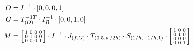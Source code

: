 \begin{equation}
    \begin{aligned}
        O & = I^{-1} \cdot [0, 0, 0, 1]                       \\
        G & = T_{(O)}^{-1T} \cdot I_R^{-1} \cdot [0, 0, 1, 0] \\
        M & =
        \begin{bsmallmatrix}
            1 & 0 & 0 & 0 \\
            0 & 1 & 0 & 0 \\
            0 & 0 & 0 & 1 \\
        \end{bsmallmatrix}
        \cdot I^{-1} \cdot J_{(f, G)} \cdot T_{(0.5, w/2h)} \cdot S_{(1/h, -1/h, 1)} \cdot
        \begin{bsmallmatrix}
            1 & 0 & 0 \\
            0 & 1 & 0 \\
            0 & 0 & 0 \\
            0 & 0 & 1 \\
        \end{bsmallmatrix}                                   \\
    \end{aligned}
\end{equation}
